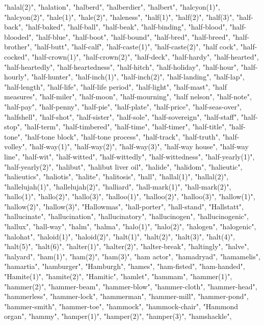 "halal(2)",
"halation",
"halberd",
"halberdier",
"halbert",
"halcyon(1)",
"halcyon(2)",
"hale(1)",
"hale(2)",
"haleness",
"half(1)",
"half(2)",
"half(3)",
"half-back",
"half-baked",
"half-ball",
"half-beak",
"half-binding",
"half-blood",
"half-blooded",
"half-blue",
"half-boot",
"half-bound",
"half-bred",
"half-breed",
"half-brother",
"half-butt",
"half-calf",
"half-caste(1)",
"half-caste(2)",
"half cock",
"half-cocked",
"half-crown(1)",
"half-crown(2)",
"half-deck",
"half-hardy",
"half-hearted",
"half-heartedly",
"half-heartedness",
"half-hitch",
"half-holiday",
"half-hour",
"half-hourly",
"half-hunter",
"half-inch(1)",
"half-inch(2)",
"half-landing",
"half-lap",
"half-length",
"half-life",
"half-life period",
"half-light",
"half-mast",
"half measures",
"half-miler",
"half-moon",
"half-mourning",
"half nelson",
"half-note",
"half-pay",
"half-penny",
"half-pie",
"half-plate",
"half-price",
"half-seas-over",
"halfshell",
"half-shot",
"half-sister",
"half-sole",
"half-sovereign",
"half-staff",
"half-stop",
"half-term",
"half-timbered",
"half-time",
"half-timer",
"half-title",
"half-tone",
"half-tone block",
"half-tone process",
"half-track",
"half-truth",
"half-volley",
"half-way(1)",
"half-way(2)",
"half-way(3)",
"half-way house",
"half-way line",
"half-wit",
"half-witted",
"half-wittedly",
"half-wittedness",
"half-yearly(1)",
"half-yearly(2)",
"halibut",
"halibut liver oil",
"halide",
"halidom",
"halieutic",
"halieutics",
"haliotis",
"halite",
"halitosis",
"hall",
"hallal(1)",
"hallal(2)",
"hallelujah(1)",
"hallelujah(2)",
"halliard",
"hall-mark(1)",
"hall-mark(2)",
"hallo(1)",
"hallo(2)",
"hallo(3)",
"halloo(1)",
"halloo(2)",
"halloo(3)",
"hallow(1)",
"hallow(2)",
"hallow(3)",
"Hallowmas",
"hall-porter",
"hall-stand",
"Hallstatt",
"hallucinate",
"hallucination",
"hallucinatory",
"hallucinogen",
"hallucinogenic",
"hallux",
"hall-way",
"halm",
"halma",
"halo(1)",
"halo(2)",
"halogen",
"halogenic",
"halohat",
"haloid(1)",
"haloid(2)",
"halt(1)",
"halt(2)",
"halt(3)",
"halt(4)",
"halt(5)",
"halt(6)",
"halter(1)",
"halter(2)",
"halter-break",
"haltingly",
"halve",
"halyard",
"ham(1)",
"ham(2)",
"ham(3)",
"ham actor",
"hamadryad",
"hamamelis",
"hamartia",
"hamburger",
"Hamburgh",
"hames",
"ham-fisted",
"ham-handed",
"Hamite(1)",
"hamite(2)",
"Hamitic",
"hamlet",
"hammam",
"hammer(1)",
"hammer(2)",
"hammer-beam",
"hammer-blow",
"hammer-cloth",
"hammer-head",
"hammerless",
"hammer-lock",
"hammerman",
"hammer-mill",
"hammer-pond",
"hammer-smith",
"hammer-toe",
"hammock",
"hammock-chair",
"Hammond organ",
"hammy",
"hamper(1)",
"hamper(2)",
"hamper(3)",
"hamshackle",
